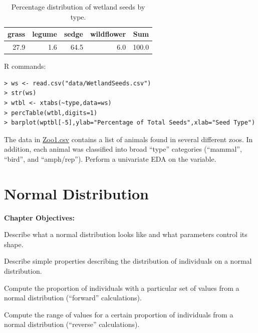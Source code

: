 \documentclass[10pt,openany]{book}\usepackage[]{graphicx}\usepackage[]{color}
\makeatletter
\newenvironment{kframe}{%
 \def\at@end@of@kframe{}%
 \ifinner\ifhmode%
  \def\at@end@of@kframe{\end{minipage}}%
  \begin{minipage}{\columnwidth}%
 \fi\fi%
 \def\FrameCommand##1{\hskip\@totalleftmargin \hskip-\fboxsep
 \colorbox{shadecolor}{##1}\hskip-\fboxsep
     \hskip-\linewidth \hskip-\@totalleftmargin \hskip\columnwidth}%
 \MakeFramed {\advance\hsize-\width
   \@totalleftmargin\z@ \linewidth\hsize
   \@setminipage}}%
 {\par\unskip\endMakeFramed%
 \at@end@of@kframe}
\newenvironment{knitrout}{}{} %
\makeatother
\begin{document}
\begin{table}[ht]
\centering
\caption{Percentage distribution of wetland seeds by type.} 
\label{tab:SeedTable}
\begin{tabular}{rrrrr}
  \hline
grass & legume & sedge & wildflower & Sum \\ 
  \hline
27.9 & 1.6 & 64.5 & 6.0 & 100.0 \\ 
   \hline
\end{tabular}
\end{table}


\begin{minipage}{\textwidth}
R commands:
\begin{knitrout}
\color{fgcolor}\begin{kframe}
\begin{verbatim}
> ws <- read.csv("data/WetlandSeeds.csv")
> str(ws)
> wtbl <- xtabs(~type,data=ws)
> percTable(wtbl,digits=1)
> barplot(wptbl[-5],ylab="Percentage of Total Seeds",xlab="Seed Type")
\end{verbatim}
\end{kframe}
\end{knitrout}
\end{minipage}

\begin{exsection}
  \item \label{revex:cuEDAZoo1} \rhw{} The data in \href{https://raw.githubusercontent.com/droglenc/NCData/master/Zoo1.csv}{Zoo1.csv} contains a list of animals found in several different zoos.  In addition, each animal was classified into broad ``type'' categories (``mammal'', ``bird'', and ``amph/rep'').  Perform a univariate EDA on the  variable. 
\end{exsection}



\chapter{Normal Distribution}  \label{chap:NormDist}
\begin{ChapObj}{\boxwidth}
  \textbf{Chapter Objectives:}
  \begin{Enumerate}
    \item Describe what a normal distribution looks like and what parameters control its shape.
    \item Describe simple properties describing the distribution of individuals on a normal distribution.
    \item Compute the proportion of individuals with a particular set of values from a normal distribution (``forward'' calculations).
    \item Compute the range of values for a certain proportion of individuals from a normal distribution (``reverse'' calculations).
  \end{Enumerate}
\end{ChapObj}
\end{document}
